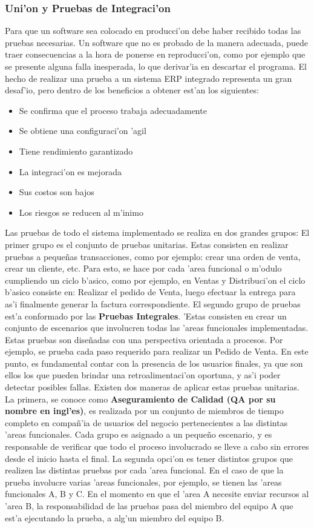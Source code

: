\subsubsection{Uni'on y Pruebas de Integraci'on}
	Para que un software sea colocado en producci'on debe haber recibido todas las pruebas necesarias. Un software que no es probado de la manera adecuada, puede traer consecuencias a la hora de ponerse en reproducci'on, como por ejemplo que se presente alguna falla inesperada, lo que derivar'ia en descartar el programa.
	El hecho de realizar una prueba a un sistema ERP integrado representa un gran desaf'io, pero dentro de los beneficios a obtener est'an los siguientes: 
\begin{itemize}
\item Se confirma que el proceso trabaja adecuadamente
\item Se obtiene una configuraci'on 'agil
\item Tiene rendimiento garantizado
\item La integraci'on es mejorada
\item Sus costos son bajos
\item Los riesgos se reducen al m'inimo
\end{itemize}
Las pruebas de todo el sistema implementado se realiza en dos grandes grupos: El primer grupo es el conjunto de pruebas unitarias. Estas consisten en realizar pruebas a peque\~nas transacciones, como por ejemplo: crear una orden de venta, crear un cliente, etc. Para esto, se hace por cada 'area funcional o m'odulo cumpliendo un ciclo b'asico, como por ejemplo, en Ventas y Distribuci'on el ciclo b'asico consiste en: Realizar el pedido de Venta, luego efectuar la entrega para as'i finalmente generar la factura correspondiente. 
El segundo grupo de pruebas est'a conformado por las \textbf{Pruebas Integrales}. 'Estas consisten en crear un conjunto de escenarios que involucren todas las 'areas funcionales implementadas. Estas pruebas son dise\~nadas con una perspectiva orientada a procesos. Por ejemplo, se prueba cada paso requerido para realizar un Pedido de Venta. En este punto, es fundamental contar con la presencia de los usuarios finales, ya que son ellos los que pueden brindar una retroalimentaci'on oportuna, y as'i poder detectar posibles fallas.
	Existen dos maneras de aplicar estas pruebas unitarias. La primera, se conoce como \textbf{Aseguramiento de Calidad (QA por su nombre en ingl'es)}, es realizada por un conjunto de miembros de tiempo completo en compa\~n'ia de usuarios del negocio pertenecientes a las distintas 'areas funcionales. Cada grupo es asignado a un peque\~no escenario, y es responsable de verificar que todo el proceso involucrado se lleve a cabo sin errores desde el inicio hasta el final. La segunda opci'on es tener distintos grupos que realizen las distintas pruebas por cada 'area funcional. En el caso de que la prueba involucre varias 'areas funcionales, por ejemplo, se tienen las 'areas funcionales A, B y C. En el momento en que el 'area A necesite enviar recursos al 'area B, la responsabilidad de las pruebas pasa del miembro del equipo A que est'a ejecutando la prueba, a alg'un miembro del equipo B.

